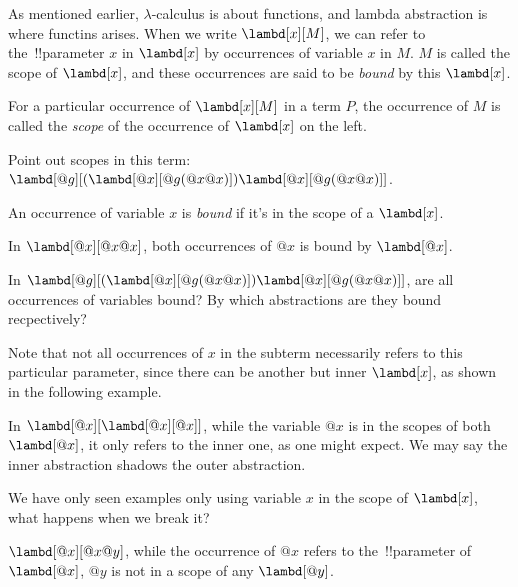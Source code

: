 \documentclass[../../../include/open-logic-section]{subfiles}
\begin{document}

As mentioned earlier, $\lambda$-calculus is about functions, and
lambda abstraction is where functins arises. When we
write $\lambd[x][M]$, we can refer to the~!!{parameter} $x$ in $\lambd[x]$ by
occurrences of variable $x$ in $M$. $M$ is called the
scope of $\lambd[x]$, and these occurrences are said to be \emph{bound} by this
$\lambd[x]$. 

\begin{defn}[Scope]
For a particular occurrence of $\lambd[x][M]$ in a term $P$, the
occurrence of $M$ is called the \emph{scope} of the occurrence of $\lambd[x]$
on the left.
\end{defn}

\begin{prob}
  Point out scopes in this term: $\lambd[@g][(\lambd[@x][@g (@x @x)]) \lambd[@x][@g (@x @x)]]$.
\end{prob}

\begin{defn}
  An occurrence of variable $x$ is \emph{bound} if it's in the scope of a $\lambd[x]$.
\end{defn}

\begin{ex}
  In $\lambd[@x][@x @x]$, both occurrences of $@x$ is bound by $\lambd[@x]$.
\end{ex}

\begin{prob}
  In $\lambd[@g][(\lambd[@x][@g (@x @x)]) \lambd[@x][@g (@x @x)]]$, are all
  occurrences of variables bound? By which abstractions are they
  bound recpectively?
\end{prob}

Note that not all occurrences of $x$ in the subterm necessarily refers to this particular parameter,
since there can be another but inner $\lambd[x]$, as shown in the
following example. 
\begin{ex}
In $\lambd[@x][\lambd[@x][@x]]$, while the variable $@x$ is in the
scopes of both $\lambd[@x]$, it only refers to the inner one, as one
might expect. We may say the inner abstraction shadows the outer
abstraction.
\end{ex}

We have only seen examples only using variable $x$ in the scope of $\lambd[x]$, 
what happens when we break it?
\begin{ex}
  $\lambd[@x][@x @y]$, while the occurrence of $@x$ refers to the~!!{parameter} of $\lambd[@x]$, $@y$ is not in a scope
  of any $\lambd[@y]$. 
\end{ex}
\end{document}
